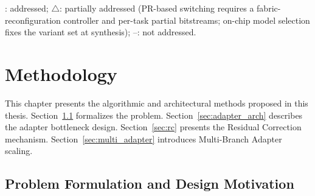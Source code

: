 \documentclass[12pt, a4paper]{report}
\numberwithin{equation}{chapter}
\numberwithin{figure}{chapter}
\numberwithin{table}{chapter}
\numberwithin{algorithm}{chapter}
\begin{document}
\begin{table}[H]
\centering
\caption{Research Gap Analysis: Positioning of MARS}
\label{tab:related_gap}
\begin{flushleft}
\footnotesize \checkmark: addressed; $\triangle$: partially addressed (PR-based switching requires a fabric-reconfiguration controller and per-task partial bitstreams; on-chip model selection fixes the variant set at synthesis); --: not addressed.
\end{flushleft}
\end{table}

\chapter{Methodology}
\label{ch:methodology}

This chapter presents the algorithmic and architectural methods proposed in this thesis. Section~\ref{sec:problem} formalizes the problem. Section~\ref{sec:adapter_arch} describes the adapter bottleneck design. Section~\ref{sec:rc} presents the Residual Correction mechanism. Section~\ref{sec:multi_adapter} introduces Multi-Branch Adapter scaling.

\section{Problem Formulation and Design Motivation}
\label{sec:problem}
\end{document}
